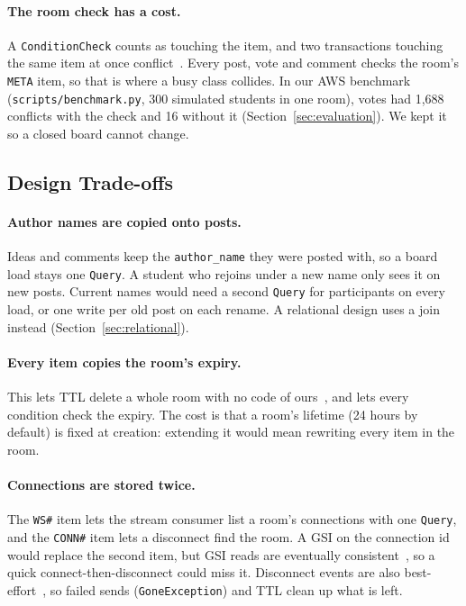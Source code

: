 \paragraph{The room check has a cost.} A \texttt{ConditionCheck} counts as touching the item, and
two transactions touching the same item at once conflict~\cite{transactions}. Every post, vote
and comment checks the room's \texttt{META} item, so that is where a busy class collides. In our
AWS benchmark (\texttt{scripts/benchmark.py}, 300 simulated students in one room), votes had
1,688 conflicts with the check and 16 without it (Section~\ref{sec:evaluation}). We kept it so a
closed board cannot change.

\subsection{Design Trade-offs}\label{sec:dm-tradeoffs}

\paragraph{Author names are copied onto posts.} Ideas and comments keep the
\texttt{author\_name} they were posted with, so a board load stays one \texttt{Query}. A student
who rejoins under a new name only sees it on new posts. Current names would need a second
\texttt{Query} for participants on every load, or one write per old post on each rename. A
relational design uses a join instead (Section~\ref{sec:relational}).

\paragraph{Every item copies the room's expiry.} This lets TTL delete a whole room with no code
of ours~\cite{ttl}, and lets every condition check the expiry. The cost is that a room's lifetime
(24 hours by default) is fixed at creation: extending it would mean rewriting every item in the room.

\paragraph{Connections are stored twice.} The \texttt{WS\#} item lets the stream consumer list a
room's connections with one \texttt{Query}, and the \texttt{CONN\#} item lets a disconnect find
the room. A GSI on the connection id would replace the second item, but GSI reads are eventually
consistent~\cite{gsi}, so a quick connect-then-disconnect could miss it. Disconnect events are
also best-effort~\cite{apigw-connect}, so failed sends (\texttt{GoneException}) and TTL clean up
what is left.
